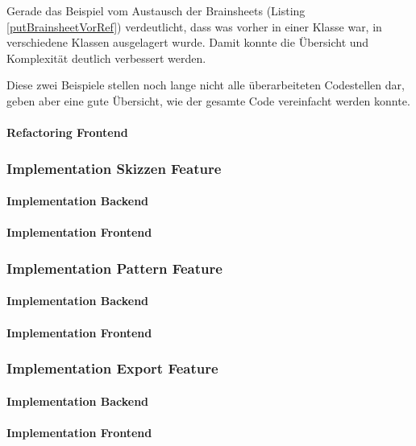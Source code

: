 Gerade das Beispiel vom Austausch der Brainsheets (Listing \ref{putBrainsheetVorRef}) verdeutlicht, dass was vorher in einer Klasse war, in verschiedene Klassen ausgelagert wurde. Damit konnte die Übersicht und Komplexität deutlich verbessert werden.

Diese zwei Beispiele stellen noch lange nicht alle überarbeiteten Codestellen dar, geben aber eine gute Übersicht, wie der gesamte Code vereinfacht werden konnte.

\paragraph*{Refactoring Frontend}

\subsubsection{Implementation Skizzen Feature}
\paragraph*{Implementation Backend}

\paragraph*{Implementation Frontend}

\subsubsection{Implementation Pattern Feature}
\paragraph*{Implementation Backend}

\paragraph*{Implementation Frontend}

\subsubsection{Implementation Export Feature}
\paragraph*{Implementation Backend}

\paragraph*{Implementation Frontend}

